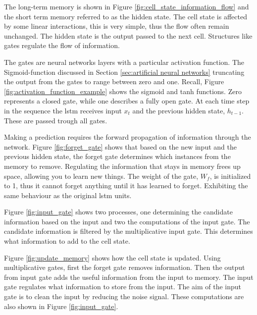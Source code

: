 The long-term memory is shown in Figure \ref{fig:cell_state_information_flow} and the short term memory referred to as the hidden state. The cell state is affected by some linear interactions, this is very simple, thus the flow often remain unchanged. The hidden state is the output passed to the next cell. Structures like gates regulate the flow of information. 

The gates are neural networks layers with a particular activation function. The Sigmoid-function discussed in Section \ref{sec:artificial neural networks} truncating the output from the gates to range between zero and one. Recall, Figure \ref{fig:activation_function_example} shows the sigmoid and tanh functions. Zero represents a closed gate, while one describes a fully open gate. At each time step in the sequence the \acrshort{lstm} receives input $x_t$ and the previous hidden state, $h_{t-1}$. These are passed trough all gates.

Making a prediction requires the forward propagation of information through the network. Figure \ref{fig:forget_gate} shows that based on the new input and the previous hidden state, the forget gate determines which instances from the memory to remove. Regulating the information that stays in memory frees up space, allowing you to learn new things. The weight of the gate, $W_f$, is initialized to 1, thus it cannot forget anything until it has learned to forget. Exhibiting the same behaviour as the original \acrshort{lstm} units. 

Figure \ref{fig:input_gate} shows two processes, one determining the candidate information based on the input and two the computations of the input gate. The candidate information is filtered by the multiplicative input gate. This determines what information to add to the cell state.

Figure \ref{fig:update_memory} shows how the cell state is updated. Using multiplicative gates, first the forget gate removes information. Then the output from input gate adds the useful information from the input to memory. The input gate regulates what information to store from the input. The aim of the input gate is to clean the input by reducing the noise signal. These computations are also shown in Figure \ref{fig:input_gate}.

